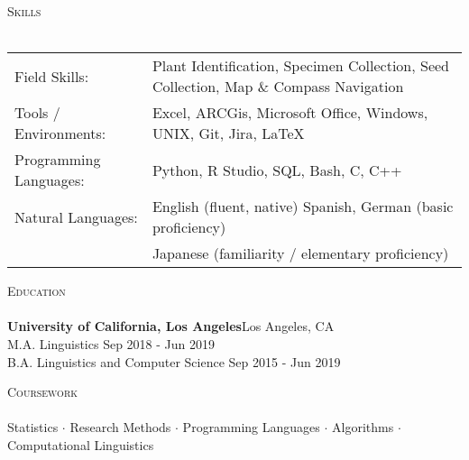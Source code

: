 \documentclass[]{article}
\newcommand{\lineunder} {
	\vspace*{-8pt} \\
	\hspace*{-18pt} \hrulefill \\
}
\newcommand{\header} [1] {
	{\hspace*{-18pt}\vspace*{6pt} \textsc{#1}}
	\vspace*{-6pt} \lineunder
}
\begin{document}
	\header{Skills}
	\begin{tabular}{ l p{11.2cm} }
		Field Skills:          & Plant Identification, Specimen Collection, Seed Collection, Map \& Compass Navigation \\
		Tools / Environments:  & Excel, ARCGis, Microsoft Office, Windows, UNIX, Git, Jira, \LaTeX
		\\
		Programming Languages: & Python, R Studio, SQL, Bash, C, C++
		\\
		Natural Languages:     & English \hfill (fluent, native) \newline  Spanish, German \hfill (basic proficiency)
		\\
		\newline & Japanese \hfill (familiarity / elementary proficiency)
		\\
	\end{tabular}
	\vspace{2mm}
	
	
	\header{Education}
	\textbf{University of California, Los Angeles}\hfill Los Angeles, CA\\
	M.A. Linguistics \hfill Sep 2018 - Jun 2019\\
	\vspace{1mm}
	B.A. Linguistics and Computer Science \hfill Sep 2015 - Jun 2019\\
	\vspace{1mm}
	\vspace{1mm}
	
	\header{Coursework}
	Statistics $\cdot$ Research Methods $\cdot$ Programming Languages $\cdot$ Algorithms $\cdot$ Computational Linguistics
	\vspace*{10mm}
	
\end{document}
